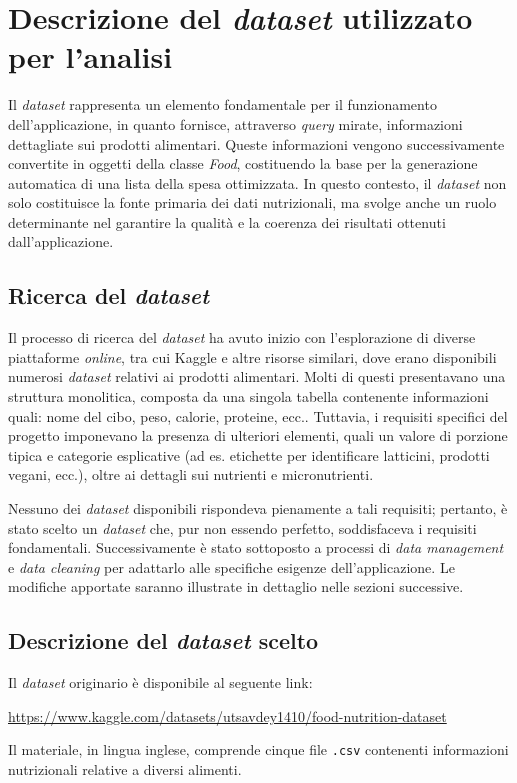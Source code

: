 \documentclass[11pt,a4paper]{article}
\begin{document}
\section{Descrizione del \textit{dataset} utilizzato per l’analisi}
Il \textit{dataset} rappresenta un elemento fondamentale per il funzionamento dell’applicazione, in quanto fornisce, attraverso \textit{query} mirate, informazioni dettagliate sui prodotti alimentari. Queste informazioni vengono successivamente convertite in oggetti della classe \textit{Food}, costituendo la base per la generazione automatica di una lista della spesa ottimizzata. In questo contesto, il \textit{dataset} non solo costituisce la fonte primaria dei dati nutrizionali, ma svolge anche un ruolo determinante nel garantire la qualità e la coerenza dei risultati ottenuti dall’applicazione.

\subsection{Ricerca del \textit{dataset}}
Il processo di ricerca del \textit{dataset} ha avuto inizio con l’esplorazione di diverse piattaforme \textit{online}, tra cui Kaggle e altre risorse similari, dove erano disponibili numerosi \textit{dataset} relativi ai prodotti alimentari. Molti di questi presentavano una struttura monolitica, composta da una singola tabella contenente informazioni quali: nome del cibo, peso, calorie, proteine, ecc.. Tuttavia, i requisiti specifici del progetto imponevano la presenza di ulteriori elementi, quali un valore di porzione tipica e categorie esplicative (ad es. etichette per identificare latticini, prodotti vegani, ecc.), oltre ai dettagli sui nutrienti e micronutrienti.

Nessuno dei \textit{dataset} disponibili rispondeva pienamente a tali requisiti; pertanto, è stato scelto un \textit{dataset} che, pur non essendo perfetto, soddisfaceva i requisiti fondamentali. Successivamente è stato sottoposto a processi di \textit{data management} e \textit{data cleaning} per adattarlo alle specifiche esigenze dell’applicazione. Le modifiche apportate saranno illustrate in dettaglio nelle sezioni successive.

\subsection{Descrizione del \textit{dataset} scelto}
Il \textit{dataset} originario è disponibile al seguente link:
\begin{center}
\url{https://www.kaggle.com/datasets/utsavdey1410/food-nutrition-dataset}
\end{center}
Il materiale, in lingua inglese, comprende cinque file \texttt{.csv} contenenti informazioni nutrizionali relative a diversi alimenti.
\end{document}
